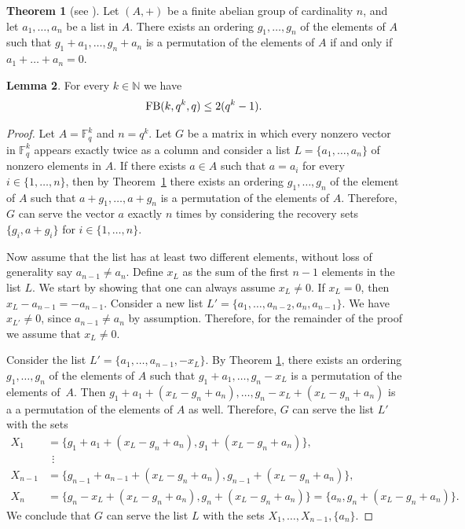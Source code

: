 \documentclass[11pt,a4paper]{article}
\theoremstyle{definition}
\newtheorem{theorem}{Theorem}[section]
\newtheorem{lemma}[theorem]{Lemma}
\newcommand{\N}{\mathbb N}
\newcommand{\F}{\mathbb F}
\newcommand{\fb}{\textnormal{FB}}
\begin{document}
\begin{theorem}[see {\cite[Theorem 4.4]{hollmann2023some}}]\label{hollmann}
    Let $(A,+)$ be a finite abelian group of cardinality $n$, and let $a_1,\dots,a_n$ be
a list in $A$. There exists an ordering $g_1,\dots,g_n$ of the elements of $A$ such that $g_1+a_1,\dots,g_n+a_n$ is a permutation of the elements of $A$ if and only if $a_1+\dots+a_n=0$.
\end{theorem}
\begin{lemma}\label{lemma:hollmann}
    For every $k\in\N$ we have
    \begin{equation*}
        \fb(k,q^k,q)\leq 2(q^k-1).
    \end{equation*}
\end{lemma}
\begin{proof}
Let $A = \F_q^k$ and $n=q^k$. Let $G$ be a matrix in which every nonzero vector in $\F_q^k$ appears exactly twice as a column and consider a list $L=\{a_1,\dots,a_n\}$ of nonzero elements in $A$. If there exists $a \in A$ such that $a=a_i$ for every $i\in\{1,\dots,n\}$, then by Theorem~\ref{hollmann} there exists an ordering $g_1,\ldots,g_n$ of the element of $A$ such that $a+g_1,\dots,a+g_n$ is a permutation of the elements of $A$. Therefore, $G$ can serve the vector $a$ exactly $n$ times by considering the recovery sets $\{g_i,a+g_i\}$ for $i \in \{1,\ldots,n\}$. 

Now assume that the list has at least two different elements, without loss of generality say $a_{n-1} \neq a_n$. Define 
$x_L$ as the sum of the first $n-1$ elements in the list $L$. We start by showing that one can always assume $x_L \neq 0$. If $x_L=0$, then $x_L - a_{n-1} = -a_{n-1}$. Consider a new list $L'=\{a_1,\ldots,a_{n-2},a_n,a_{n-1}\}$. We have $x_{L'} \neq 0$, since $a_{n-1} \neq a_n$ by assumption. Therefore, for the remainder of the proof we assume that $x_L \neq 0$.

Consider the list $L'=\{a_1,\ldots,a_{n-1},-x_L\}$. By Theorem \ref{hollmann}, there exists an ordering $g_1,\dots,g_n$ of the elements of $A$ such that $g_1+a_1,\dots,g_n - x_L$ is a permutation of the elements of~$A$. Then $g_1+a_1+(x_L-g_n+a_n),\dots, g_n-x_L+(x_L-g_n+a_n)$ is a a permutation of the elements of $A$ as well. Therefore, $G$ can serve the list $L'$ with the sets 
\begin{align*}
X_1&=\{g_1+a_1+(x_L-g_n+a_n),g_1+(x_L-g_n+a_n)\}, \\
&\,  \; \vdots \\
X_{n-1}&=\{g_{n-1}+a_{n-1}+(x_L-g_n+a_n),g_{n-1}+(x_L-g_n+a_n)\}, \\
X_n&=\{g_n-x_L+(x_L-g_n+a_n),g_n+(x_L-g_n+a_n)\} =\{a_n,g_n+(x_L-g_n+a_n)\}.
\end{align*}
We conclude that $G$ can serve the list $L$ with the sets $X_1,\dots,X_{n-1},\{a_n\}$.
\end{proof}
\end{document}
